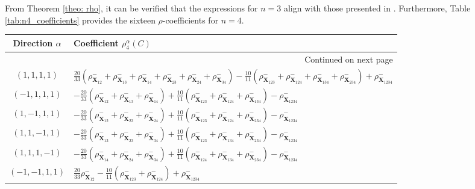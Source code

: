 \documentclass[11pt,a4paper]{article}
\begin{document}
From Theorem \ref{theo: rho}, it can be verified that the expressions for $n=3$ align with those presented in \cite[Theorem 3.1]{Gar2013}. Furthermore, Table \ref{tab:n4_coefficients} provides the sixteen $\rho$-coefficients for $n=4$.
\begin{table}[htb]
\begin{center}
\begin{longtable}{c p{}}
\hline
\textbf{Direction $\alpha$} & \textbf{Coefficient $\rho_4^\alpha(C)$} \\
\hline
\endhead %
\hline
\multicolumn{2}{|r|}{{Continued on next page}} \\
\endfoot %
\hline
\endlastfoot %
$(1,1,1,1)$ & $\frac{20}{33}(\rho^-_{\mathbf{X}_{12}} + \rho^-_{\mathbf{X}_{13}} + \rho^-_{\mathbf{X}_{14}} + \rho^-_{\mathbf{X}_{23}} + \rho^-_{\mathbf{X}_{24}} + \rho^-_{\mathbf{X}_{34}}) - \frac{10}{11}(\rho^-_{\mathbf{X}_{123}} + \rho^-_{\mathbf{X}_{124}} + \rho^-_{\mathbf{X}_{134}} + \rho^-_{\mathbf{X}_{234}}) + \rho^-_{\mathbf{X}_{1234}}$ \\

$(-1,1,1,1)$ & $-\frac{20}{33}(\rho^-_{\mathbf{X}_{12}} + \rho^-_{\mathbf{X}_{13}} + \rho^-_{\mathbf{X}_{14}}) + \frac{10}{11}(\rho^-_{\mathbf{X}_{123}} + \rho^-_{\mathbf{X}_{124}} + \rho^-_{\mathbf{X}_{134}}) - \rho^-_{\mathbf{X}_{1234}}$ \\

$(1,-1,1,1)$ & $-\frac{20}{33}(\rho^-_{\mathbf{X}_{12}} + \rho^-_{\mathbf{X}_{23}} + \rho^-_{\mathbf{X}_{24}}) + \frac{10}{11}(\rho^-_{\mathbf{X}_{123}} + \rho^-_{\mathbf{X}_{124}} + \rho^-_{\mathbf{X}_{234}}) - \rho^-_{\mathbf{X}_{1234}}$ \\

$(1,1,-1,1)$ & $-\frac{20}{33}(\rho^-_{\mathbf{X}_{13}} + \rho^-_{\mathbf{X}_{23}} + \rho^-_{\mathbf{X}_{34}}) + \frac{10}{11}(\rho^-_{\mathbf{X}_{123}} + \rho^-_{\mathbf{X}_{134}} + \rho^-_{\mathbf{X}_{234}}) - \rho^-_{\mathbf{X}_{1234}}$ \\

$(1,1,1,-1)$ & $-\frac{20}{33}(\rho^-_{\mathbf{X}_{14}} + \rho^-_{\mathbf{X}_{24}} + \rho^-_{\mathbf{X}_{34}}) + \frac{10}{11}(\rho^-_{\mathbf{X}_{124}} + \rho^-_{\mathbf{X}_{134}} + \rho^-_{\mathbf{X}_{234}}) - \rho^-_{\mathbf{X}_{1234}}$ \\

$(-1,-1,1,1)$ & $\frac{20}{33}\rho^-_{\mathbf{X}_{12}} - \frac{10}{11}(\rho^-_{\mathbf{X}_{123}} + \rho^-_{\mathbf{X}_{124}}) + \rho^-_{\mathbf{X}_{1234}}$ \\


\end{longtable}
\end{center}
\end{table}
\end{document}
